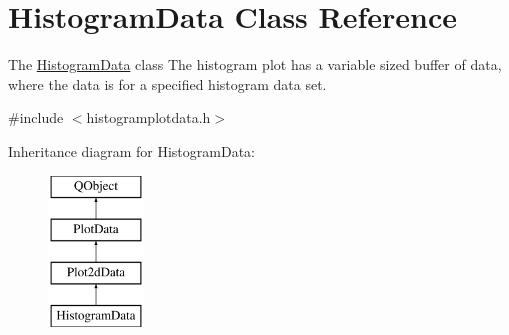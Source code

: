 \hypertarget{class_histogram_data}{\section{Histogram\-Data Class Reference}
\label{class_histogram_data}
}


The \hyperlink{class_histogram_data}{Histogram\-Data} class The histogram plot has a variable sized buffer of data, where the data is for a specified histogram data set.  




{\ttfamily \#include $<$histogramplotdata.\-h$>$}

Inheritance diagram for Histogram\-Data\-:\begin{figure}[H]
\begin{center}
\leavevmode
\includegraphics[height=4.000000cm]{class_histogram_data}
\end{center}
\end{figure}

